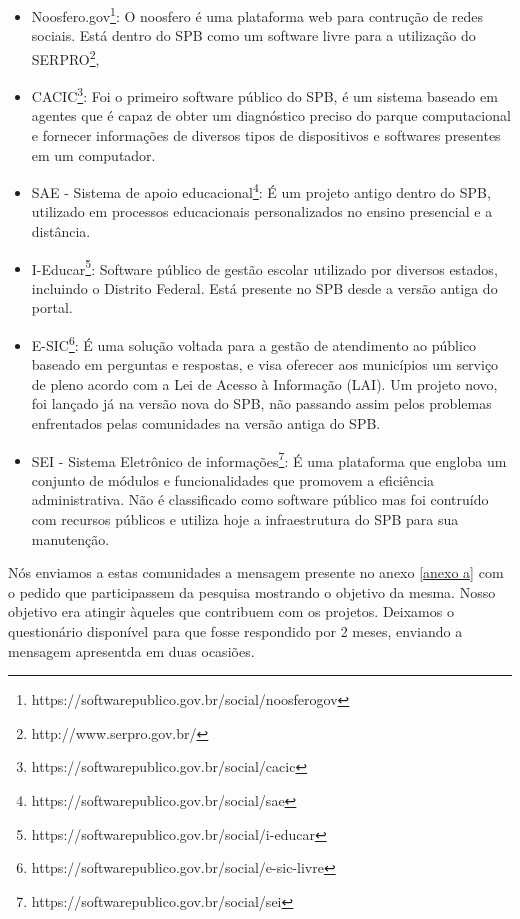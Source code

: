 \begin{itemize}

\item Noosfero.gov\footnote{https://softwarepublico.gov.br/social/noosferogov}: 
O noosfero é uma plataforma web para contrução de redes sociais. Está dentro do
SPB como um software livre para a utilização do SERPRO\footnote{http://www.serpro.gov.br/}, 

\item CACIC\footnote{https://softwarepublico.gov.br/social/cacic}: Foi o primeiro 
software público do SPB, é um sistema baseado em agentes que é capaz de obter um 
diagnóstico preciso do parque computacional e fornecer informações de diversos tipos 
de dispositivos e softwares presentes em um computador.

\item SAE - Sistema de apoio educacional\footnote{https://softwarepublico.gov.br/social/sae}:
É um projeto antigo dentro do SPB, utilizado em processos educacionais personalizados no 
ensino presencial e a distância.  

\item I-Educar\footnote{https://softwarepublico.gov.br/social/i-educar}: Software público de 
gestão escolar utilizado por diversos estados, incluindo o Distrito Federal. Está presente
no SPB desde a versão antiga do portal.

\item E-SIC\footnote{https://softwarepublico.gov.br/social/e-sic-livre}: É uma solução voltada 
para a gestão de atendimento ao público baseado em perguntas e respostas, e visa 
oferecer aos municípios um serviço de pleno acordo com a Lei de Acesso à Informação (LAI).
Um projeto novo, foi lançado já na versão nova do SPB, não passando assim pelos 
problemas enfrentados pelas comunidades na versão antiga do SPB.

\item SEI - Sistema Eletrônico de informações\footnote{https://softwarepublico.gov.br/social/sei}:
É uma plataforma que engloba um conjunto de módulos e funcionalidades que promovem 
a eficiência administrativa. Não é classificado como software público mas foi contruído com
recursos públicos e utiliza hoje a infraestrutura do SPB para sua manutenção.

\end{itemize}


Nós enviamos a estas comunidades a mensagem presente no anexo \ref{anexo a}
com o pedido que participassem da pesquisa mostrando o objetivo da mesma. Nosso objetivo 
era atingir àqueles que contribuem com os projetos. Deixamos o questionário disponível 
para que fosse respondido por 2 meses, enviando a mensagem apresentda em duas ocasiões.

